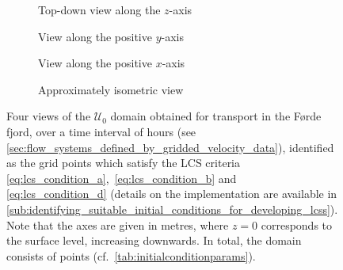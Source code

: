 \begin{figure}[htpb]
    \centering
    \begin{subfigure}[b]{0.475\textwidth}
        \centering
        \caption[]{{\small Top-down view along the $z$-axis}}
        \label{fig:fjord_abd_z}
    \end{subfigure}
    \begin{subfigure}[b]{0.475\textwidth}
        \centering
        \caption[]{{\small View along the positive $y$-axis}}
        \label{fig:fjord_abd_y}
    \end{subfigure}

    \begin{subfigure}[b]{0.475\textwidth}
        \centering
        \caption[]{{\small View along the positive $x$-axis}}
        \label{fig:fjord_abd_x}
    \end{subfigure}
    \begin{subfigure}[b]{0.475\textwidth}
        \centering
        \caption[]{{\small Approximately isometric view}}
        \label{fig:fjord_abd_isometric}
    \end{subfigure}
    \caption[Four views of the $\mathcal{U}_{0}$ domain obtained for transport
    in the Førde fjord]
    {
        Four views of the $\mathcal{U}_{0}$ domain obtained for transport in
        the Førde fjord, over a time interval of  hours
        (see \cref{sec:flow_systems_defined_by_gridded_velocity_data}),
        identified as the grid points which satisfy the
        LCS criteria \eqref{eq:lcs_condition_a},~\eqref{eq:lcs_condition_b} and~
        \eqref{eq:lcs_condition_d} (details on the implementation are available
        in
        \cref{sub:identifying_suitable_initial_conditions_for_developing_lcss}).
        Note that the axes are given in metres, where $z=0$ corresponds to
        the surface level, increasing downwards. In total, the domain consists
        of  points (cf.\ \cref{tab:initialconditionparams}).
}
    \label{fig:fjord_abd}
\end{figure}


